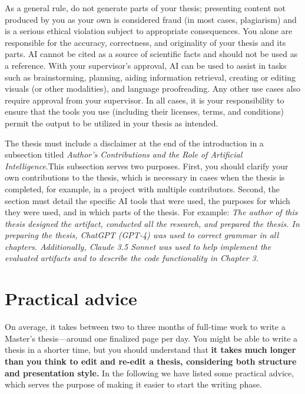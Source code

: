 As a general rule, do not generate parts of your thesis; presenting
content not produced by you as your own is considered fraud (in most
cases, plagiarism) and is a serious ethical violation subject to
appropriate consequences. You alone are responsible for the accuracy,
correctness, and originality of your thesis and its parts. AI cannot
be cited as a source of scientific facts and should not be used as a
reference. With your supervisor's approval, AI can be used to assist
in tasks such as brainstorming, planning, aiding information
retrieval, creating or editing visuals (or other modalities), and
language proofreading. Any other use cases also require approval from
your supervisor. In all cases, it is your responsibility to ensure
that the tools you use (including their licenses, terms, and
conditions) permit the output to be utilized in your thesis as intended.

The thesis must include a disclaimer at the end of the introduction
in a subsection titled \DIFdelbegin {}\DIFdelend \DIFaddbegin {}\DIFaddend \textit{Author's Contributions and the Role
of Artificial Intelligence}.\DIFdelbegin {}\DIFdelend \DIFaddbegin {}\DIFaddend This subsection serves two purposes.
First, you should clarify your own contributions to the thesis, which
is necessary in cases when the thesis is completed, for example, in a
project with multiple contributors. Second, the section must detail
the specific AI tools that were used, the purposes for which they
were used, and in which parts of the thesis. For example: \textit{The
author of this thesis designed the artifact, conducted all the
research, and prepared the thesis. In preparing the thesis, ChatGPT
(GPT-4) was used to correct grammar in all chapters. Additionally,
Claude 3.5 Sonnet was used to help implement the evaluated artifacts
and to describe the code functionality in Chapter 3.}

\section{Practical advice}

On average, it takes between two to three months of full-time work to
write a Master’s thesis---around one finalized page per day. You
might be able to write a thesis in a shorter time, but you should
understand that \textbf{it takes much longer than you think to edit
and re-edit a thesis, considering both structure and presentation
style.} In the following we have listed some practical advice, which
serves the purpose of making it easier to start the writing phase.

